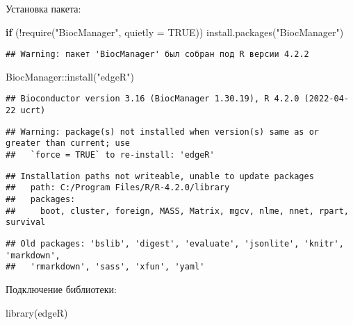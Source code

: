 \documentclass[
]{article}
\newenvironment{Shaded}{\begin{snugshade}}{\end{snugshade}}
\newcommand{\AttributeTok}[1]{\textcolor[rgb]{0.77,0.63,0.00}{#1}}
\newcommand{\ConstantTok}[1]{\textcolor[rgb]{0.00,0.00,0.00}{#1}}
\newcommand{\ControlFlowTok}[1]{\textcolor[rgb]{0.13,0.29,0.53}{\textbf{#1}}}
\newcommand{\FunctionTok}[1]{\textcolor[rgb]{0.00,0.00,0.00}{#1}}
\newcommand{\NormalTok}[1]{#1}
\newcommand{\SpecialCharTok}[1]{\textcolor[rgb]{0.00,0.00,0.00}{#1}}
\newcommand{\StringTok}[1]{\textcolor[rgb]{0.31,0.60,0.02}{#1}}
\begin{document}
Установка пакета:

\begin{Shaded}
\begin{Highlighting}[]
\ControlFlowTok{if}\NormalTok{ (}\SpecialCharTok{!}\FunctionTok{require}\NormalTok{(}\StringTok{"BiocManager"}\NormalTok{, }\AttributeTok{quietly =} \ConstantTok{TRUE}\NormalTok{))}
    \FunctionTok{install.packages}\NormalTok{(}\StringTok{"BiocManager"}\NormalTok{)}
\end{Highlighting}
\end{Shaded}

\begin{verbatim}
## Warning: пакет 'BiocManager' был собран под R версии 4.2.2
\end{verbatim}

\begin{Shaded}
\begin{Highlighting}[]
\NormalTok{BiocManager}\SpecialCharTok{::}\FunctionTok{install}\NormalTok{(}\StringTok{"edgeR"}\NormalTok{)}
\end{Highlighting}
\end{Shaded}

\begin{verbatim}
## Bioconductor version 3.16 (BiocManager 1.30.19), R 4.2.0 (2022-04-22 ucrt)
\end{verbatim}

\begin{verbatim}
## Warning: package(s) not installed when version(s) same as or greater than current; use
##   `force = TRUE` to re-install: 'edgeR'
\end{verbatim}

\begin{verbatim}
## Installation paths not writeable, unable to update packages
##   path: C:/Program Files/R/R-4.2.0/library
##   packages:
##     boot, cluster, foreign, MASS, Matrix, mgcv, nlme, nnet, rpart, survival
\end{verbatim}

\begin{verbatim}
## Old packages: 'bslib', 'digest', 'evaluate', 'jsonlite', 'knitr', 'markdown',
##   'rmarkdown', 'sass', 'xfun', 'yaml'
\end{verbatim}

Подключение библиотеки:

\begin{Shaded}
\begin{Highlighting}[]
\FunctionTok{library}\NormalTok{(edgeR)}
\end{Highlighting}
\end{Shaded}
\end{document}
